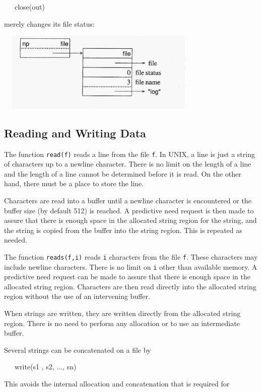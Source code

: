 {\ttfamily\mdseries
\ \ \ close(out)}

\noindent merely changes its file status:

\ \  \includegraphics[width=3.6335in,height=1.5063in]{ib-img/ib-img110.jpg} 

\subsection{Reading and Writing Data}

The function \texttt{read(f)} reads a line from the file
\texttt{f}. In UNIX, a line is just a string of characters up to a
newline character. There is no limit on the length of a line and the
length of a line cannot be determined before it is read. On the other
hand, there must be a place to store the line.

Characters are read into a buffer until a newline character is
encountered or the buffer size (by default 512) is reached. A
predictive need request is then made to assure that there is enough
space in the allocated string region for the string, and the string is
copied from the buffer into the string region. This is repeated as
needed.

The function \texttt{reads(f,i)} reads \texttt{i} characters from the
file \texttt{f}. These characters may include newline
characters. There is no limit on \texttt{i} other than available
memory. A predictive need request can be made to assure that there is
enough space in the allocated string region. Characters are then read
directly into the allocated string region without the use of an
intervening buffer.

When strings are written, they are written directly from the allocated
string region. There is no need to perform any allocation or to use an
intermediate buffer.

Several strings can be concatenated on a file by

{\ttfamily\mdseries
\ \ \ write(s1 , s2, ..., sn)}

This avoids the internal allocation and concatenation that is required for

